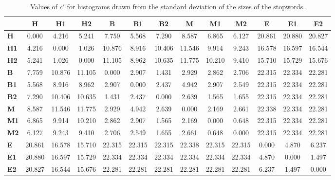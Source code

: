 \begin{table*}[h!]
\begin{center}
\begin{tabular}{| l || c | c | c || c | c | c || c | c | c || c | c | c |}\hline
 & {\bf H} & {\bf H1} & {\bf H2} & {\bf B} & {\bf B1} & {\bf B2} & {\bf M} & {\bf M1} & {\bf M2} & {\bf E} & {\bf E1} & {\bf E2} \\\hline\hline
{\bf H} & 0.000 & 4.216 & 5.241 & 7.759 & 5.568 & 7.290 & 8.587 & 6.865 & 6.127 & 20.861 & 20.880 & 20.827 \\\hline
{\bf H1} & 4.216 & 0.000 & 1.026 & 10.876 & 8.916 & 10.406 & 11.546 & 9.914 & 9.243 & 16.578 & 16.597 & 16.544 \\\hline
{\bf H2} & 5.241 & 1.026 & 0.000 & 11.105 & 8.962 & 10.635 & 11.775 & 10.210 & 9.410 & 15.710 & 15.729 & 15.676 \\\hline\hline
{\bf B} & 7.759 & 10.876 & 11.105 & 0.000 & 2.907 & 1.431 & 2.929 & 2.862 & 2.706 & 22.315 & 22.334 & 22.281 \\\hline
{\bf B1} & 5.568 & 8.916 & 8.962 & 2.907 & 0.000 & 2.437 & 4.942 & 2.907 & 2.549 & 22.315 & 22.334 & 22.281 \\\hline
{\bf B2} & 7.290 & 10.406 & 10.635 & 1.431 & 2.437 & 0.000 & 2.639 & 1.565 & 1.655 & 22.315 & 22.334 & 22.281 \\\hline\hline
{\bf M} & 8.587 & 11.546 & 11.775 & 2.929 & 4.942 & 2.639 & 0.000 & 2.169 & 2.661 & 22.338 & 22.334 & 22.281 \\\hline
{\bf M1} & 6.865 & 9.914 & 10.210 & 2.862 & 2.907 & 1.565 & 2.169 & 0.000 & 0.648 & 22.315 & 22.334 & 22.281 \\\hline
{\bf M2} & 6.127 & 9.243 & 9.410 & 2.706 & 2.549 & 1.655 & 2.661 & 0.648 & 0.000 & 22.315 & 22.334 & 22.281 \\\hline\hline
{\bf E} & 20.861 & 16.578 & 15.710 & 22.315 & 22.315 & 22.315 & 22.338 & 22.315 & 22.315 & 0.000 & 4.870 & 6.237 \\\hline
{\bf E1} & 20.880 & 16.597 & 15.729 & 22.334 & 22.334 & 22.334 & 22.334 & 22.334 & 22.334 & 4.870 & 0.000 & 1.497 \\\hline
{\bf E2} & 20.827 & 16.544 & 15.676 & 22.281 & 22.281 & 22.281 & 22.281 & 22.281 & 22.281 & 6.237 & 1.497 & 0.000 \\\hline
\end{tabular}
\caption{Values of $c'$ for histograms drawn from the standard deviation of the sizes of the stopwords.}
\end{center}
\end{table*}